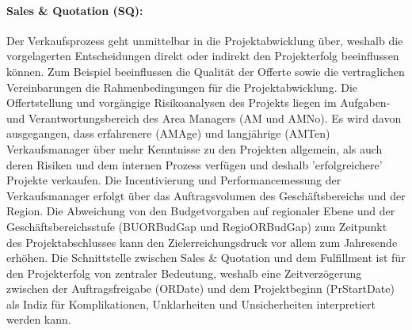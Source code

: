 \paragraph{Sales \& Quotation (SQ):} Der Verkaufsprozess geht unmittelbar in die Projektabwicklung über, weshalb die vorgelagerten Entscheidungen direkt oder indirekt den Projekterfolg beeinflussen können. Zum Beispiel beeinflussen die Qualität der Offerte sowie die vertraglichen Vereinbarungen die Rahmenbedingungen für die Projektabwicklung. Die Offertstellung und vorgängige Risikoanalysen des Projekts liegen im Aufgaben- und Verantwortungsbereich des Area Managers (AM und AMNo). Es wird davon ausgegangen, dass erfahrenere (AMAge) und langjährige (AMTen) Verkaufsmanager über mehr Kenntnisse zu den Projekten allgemein, als auch deren Risiken und dem internen Prozess verfügen und deshalb 'erfolgreichere' Projekte verkaufen. Die Incentivierung und Performancemessung der Verkaufsmanager erfolgt über das Auftragsvolumen des Geschäftsbereichs und der Region. Die Abweichung von den Budgetvorgaben auf regionaler Ebene und der Geschäftsbereichsstufe (BUORBudGap und RegioORBudGap) zum Zeitpunkt des Projektabschlusses kann den Zielerreichungsdruck vor allem zum Jahresende erhöhen. Die Schnittstelle zwischen Sales \& Quotation und dem Fulfillment ist für den Projekterfolg von zentraler Bedeutung, weshalb eine Zeitverzögerung zwischen der Auftragsfreigabe (ORDate) und dem Projektbeginn (PrStartDate) als Indiz für Komplikationen, Unklarheiten und Unsicherheiten interpretiert werden kann. 
